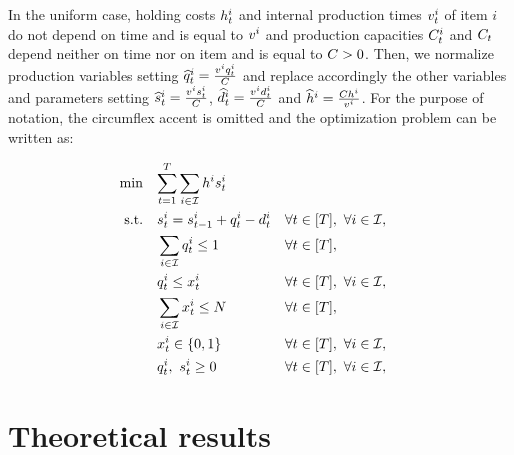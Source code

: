 \medskip

In the uniform case, holding costs $h_t^i$ and internal production times $v_t^i$ of item $i$ do not depend on time and is equal to $v^i$ and production capacities $C_t^i$ and $C_t$ depend neither on time nor on item and is equal to $C>0$.
Then, we normalize production variables setting $\widehat{q}_t^i=\frac{v^iq_t^i}{C}$ and replace accordingly the other variables and parameters setting $\widehat{s}_t^i=\frac{v^is_t^i}{C}$, $\widehat{d}_t^i=\frac{v^id_t^i}{C}$ and $\widehat{h}^i=\frac{Ch^i}{v^i}$.
For the purpose of notation, the circumflex accent is omitted and the optimization problem can be written as:

\begin{subequations}\label{eq:Uniform-CLSP-BS}
  \begin{align}
    \min\quad & \rlap{$\ds \sum_{t=1}^{\horizon} \sum_{i\in\REF} \holding^i \inventory_t^i$}
    \label{eq:Uniform-CLSP-BS:objective}
    \\
    \st\quad & \ds \inventory_t^i = \inventory_{t-1}^i + \quantity_t^i - \demand_t^i && \forall t\in\range{\horizon},\ \forall i\in\REF,
    \label{eq:Uniform-CLSP-BS:stock-dynamics}
    \\
    & \ds \sum_{i\in\REF} \quantity_t^i \le 1 && \forall t\in\range{\horizon},
    \label{eq:Uniform-CLSP-BS:capacity}
    \\
    & \ds \quantity_t^i \le \setup_t^i && \forall t\in\range{\horizon},\ \forall i\in\REF,
    \label{eq:Uniform-CLSP-BS:item-capacity}
    \\
    & \ds \sum_{i\in\REF} \setup_t^i \le \nbsetups && \forall t\in\range{\horizon},
    \label{eq:Uniform-CLSP-BS:setups}
    \\
    & \ds \setup_t^i \in \crbracket{0,1} && \forall t\in\range{\horizon},\ \forall i\in\REF,
    \label{eq:Uniform-CLSP-BS:boolean}
    \\
    & \ds \quantity_t^i,\ \inventory_t^i \ge 0 && \forall t\in\range{\horizon},\ \forall i\in\REF,
    \label{eq:Uniform-CLSP-BS:positivity}
  \end{align}
\end{subequations}


\section{Theoretical results}
\label{sec:PDP:deterministic:theoretical-results}


